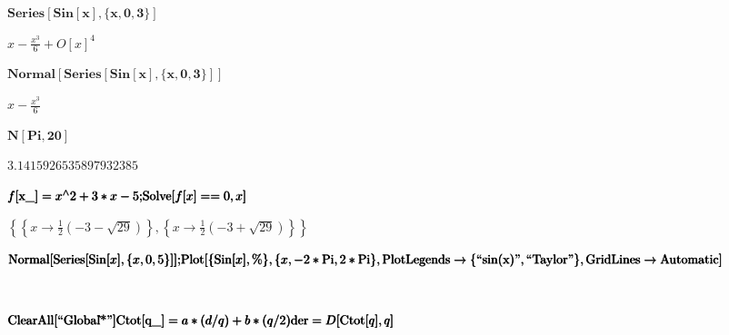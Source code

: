 \documentclass{article}
\begin{document}
\begin{doublespace}
\noindent\(\pmb{\text{Series}[\text{Sin}[x],\{x,0,3\}]}\)
\end{doublespace}

\begin{doublespace}
\noindent\(x-\frac{x^3}{6}+O[x]^4\)
\end{doublespace}

\begin{doublespace}
\noindent\(\pmb{\text{Normal}[\text{Series}[\text{Sin}[x],\{x,0,3\}]]}\)
\end{doublespace}

\begin{doublespace}
\noindent\(x-\frac{x^3}{6}\)
\end{doublespace}

\begin{doublespace}
\noindent\(\pmb{N[\text{Pi},20]}\)
\end{doublespace}

\begin{doublespace}
\noindent\(3.1415926535897932385\)
\end{doublespace}

\begin{doublespace}
\noindent\(\pmb{f[\text{x$\_$}] = x{}^{\wedge}2+3*x-5;}\\
\pmb{\text{Solve}[f[x]==0,x]}\)
\end{doublespace}

\begin{doublespace}
\noindent\(\left\{\left\{x\to \frac{1}{2} \left(-3-\sqrt{29}\right)\right\},\left\{x\to \frac{1}{2} \left(-3+\sqrt{29}\right)\right\}\right\}\)
\end{doublespace}

\begin{doublespace}
\noindent\(\pmb{\text{Normal}[\text{Series}[\text{Sin}[x], \{x,0,5\}]];}\\
\pmb{\text{Plot}[\{\text{Sin}[x],\%\},\{x,-2*\text{Pi},2*\text{Pi}\}, \text{PlotLegends}\to \{\text{{``}sin(x){''}},\text{{``}Taylor{''}}\}, \text{GridLines}\to
\text{Automatic}]}\)
\end{doublespace}

\begin{doublespace}
\noindent\(\begin{array}{cc}
  &  \\
\end{array}\)
\end{doublespace}

\begin{doublespace}
\noindent\(\pmb{\text{ClearAll}[\text{{``}Global$\grave{ }$*{''}}]}\\
\pmb{\text{Ctot}[\text{q$\_$}] = a*(d/q)+b*(q/2)}\\
\pmb{\text{der} = D[\text{Ctot}[q],q]}\)
\end{doublespace}
\end{document}
